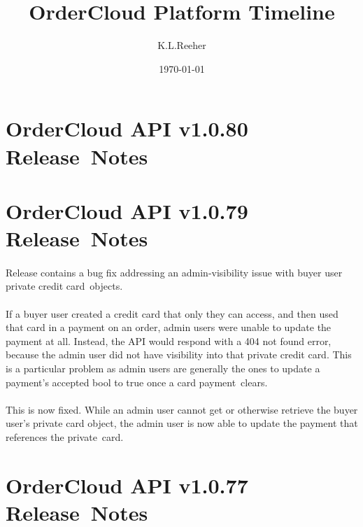 \documentclass{memoir}%
\title{OrderCloud Platform Timeline}%
\author{K.L.Reeher}%
\date{\today}%
\begin{document}
%
\normalsize%
\maketitle%
\section*{OrderCloud API v1.0.80 Release~Notes}%
\paragraph*{}%

%
\section*{OrderCloud API v1.0.79 Release~Notes}%
\paragraph*{}%

%
\paragraph*{}%
Release contains a bug fix addressing an admin{-}visibility issue with buyer user private credit card~objects. 

%
\paragraph*{}%
If a buyer user created a credit card that only they can access, and then used that card in a payment on an order, admin users were unable to update the payment at all. Instead, the API would respond with a 404 not found error, because the admin user did not have visibility into that private credit card. This is a particular problem as admin users are generally the ones to update a payment’s accepted bool to true once a card payment~clears. 

%
\paragraph*{}%
This is now fixed. While an admin user cannot get or otherwise retrieve the buyer user’s private card object, the admin user is now able to update the payment that references the private~card. 

%
\section*{OrderCloud API v1.0.77 Release~Notes}%
\end{document}

